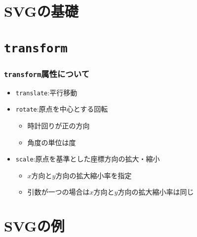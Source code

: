 

\frame{\maketitle}
\section{SVGの基礎}
\section{\texttt{transform}}
\begin{frame}[containsverbatim]
 \frametitle{\texttt{transform}属性について}
\begin{itemize}
 \item \texttt{translate}:平行移動
 \item \texttt{rotate}:原点を中心とする回転\\
\begin{itemize}
 \item 時計回りが正の方向
 \item 角度の単位は度
\end{itemize}
 \item \texttt{scale}:原点を基準とした座標方向の拡大・縮小\\
\begin{itemize}
 \item $x$方向と$y$方向の拡大縮小率を指定
 \item 引数が一つの場合は$x$方向と$y$方向の拡大縮小率は同じ
\end{itemize}
\end{itemize}
\end{frame}

\section{SVGの例}
